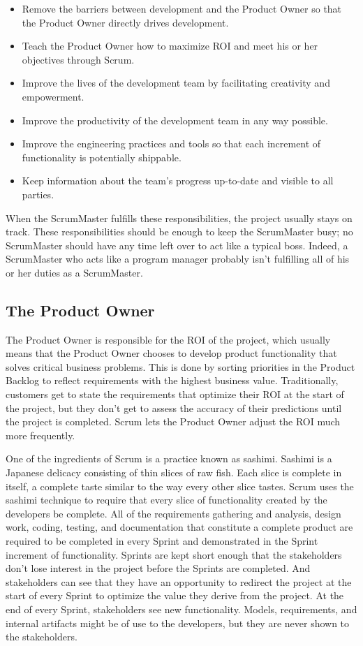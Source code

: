 \begin{itemize}
	\item Remove the barriers between development and the Product Owner so that the Product Owner directly drives development.
	\item Teach the Product Owner how to maximize ROI and meet his or her objectives through Scrum.
	\item Improve the lives of the development team by facilitating creativity and empowerment.
	\item Improve the productivity of the development team in any way possible.
	\item Improve the engineering practices and tools so that each increment of functionality is potentially shippable.
	\item Keep information about the team’s progress up-to-date and visible to all parties.
\end{itemize}

When the ScrumMaster fulfills these responsibilities, the project usually stays on track. These responsibilities should be enough to keep the ScrumMaster busy; no ScrumMaster should have any time left over to act like a typical boss. Indeed, a ScrumMaster who acts like a program manager probably isn’t fulfilling all of his or her duties as a ScrumMaster.


\subsection{The Product Owner}

The Product Owner is responsible for the ROI of the project, which usually means that the Product Owner chooses to develop product functionality that solves critical business problems. This is done by sorting priorities in the Product Backlog to reflect requirements with the highest business value. Traditionally, customers get to state the requirements that optimize their ROI at the start of the project, but they don’t get to assess the accuracy of their predictions until the project is completed. Scrum lets the Product Owner adjust the ROI much more frequently. 


One of the ingredients of Scrum is a practice known as sashimi. Sashimi is a Japanese delicacy consisting of thin slices of raw fish. Each slice is complete in itself, a complete taste similar to the way every other slice tastes. Scrum uses the sashimi technique to require that every slice of functionality created by the developers be complete. All of the requirements gathering and analysis, design work, coding, testing, and documentation that constitute a complete product are required to be completed in every Sprint and demonstrated in the Sprint increment of functionality. Sprints are kept short enough that the stakeholders don’t lose interest in the project before the Sprints are completed. And stakeholders can see that they have an opportunity to redirect the project at the start of every Sprint to optimize the value they derive from the project. At the end of every Sprint, stakeholders see new functionality. Models, requirements, and internal artifacts might be of use to the developers, but they are never shown to the stakeholders.


